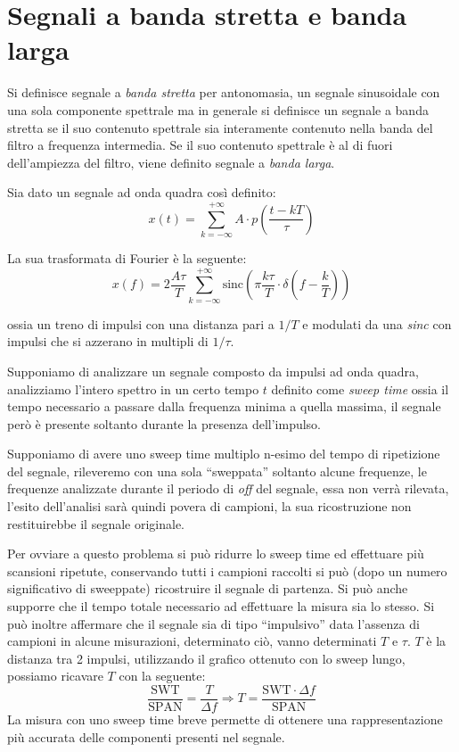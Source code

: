 
\section{Segnali a banda stretta e banda larga}
Si definisce segnale a \textit{banda stretta} per antonomasia, un segnale sinusoidale
con una sola componente spettrale ma in generale
si definisce un segnale a banda stretta se il suo contenuto spettrale
sia interamente contenuto nella banda del filtro a frequenza intermedia.
Se il suo contenuto spettrale è al di fuori dell'ampiezza del filtro,
viene definito segnale a \textit{banda larga}.

Sia dato un segnale ad onda quadra così definito:
$$
x(t) = \sum_{k = -\infty}^{+\infty} A\cdot p\left(\frac{t-kT}{\tau}\right)
$$

La sua trasformata di Fourier è la seguente:
$$
x(f) = 2 \frac{A\tau}{T} \sum_{k=-\infty}^{+\infty} \text{sinc} \left(\pi \frac{k\tau}{T}\cdot  \delta\left(f-\frac{k}{T}\right)  \right)
$$

ossia un treno di impulsi con una distanza pari a $1/T$ e modulati
da una \textit{sinc} con impulsi che si azzerano in multipli di $1/\tau$.

Supponiamo di analizzare un segnale composto da impulsi ad onda quadra,
analizziamo l'intero spettro in un certo tempo $t$ definito come \textit{sweep time}
ossia il tempo necessario a passare dalla frequenza minima a quella massima,
il segnale però è presente soltanto durante la presenza dell'impulso.

\begin{figure}[h] %
    \centering
    \def\svgwidth{0.6\columnwidth}
    
\end{figure}


Supponiamo di avere uno sweep time multiplo n-esimo
del tempo di ripetizione del segnale, rileveremo con una sola ``sweppata''
soltanto alcune frequenze, le frequenze analizzate durante il periodo di \textit{off}
del segnale, essa non verrà rilevata, l'esito dell'analisi sarà quindi povera di campioni,
la sua ricostruzione non restituirebbe il segnale originale.

Per ovviare a questo problema si può ridurre lo sweep time ed effettuare più scansioni
ripetute, conservando tutti i campioni raccolti si può (dopo un numero significativo di sweeppate)
ricostruire il segnale di partenza. Si può anche supporre che il tempo totale necessario ad effettuare
la misura sia lo stesso.
Si può inoltre affermare che il segnale sia di tipo ``impulsivo'' data l'assenza di campioni in
alcune misurazioni, determinato ciò, vanno determinati $T$ e $\tau$.
$T$ è la distanza tra 2 impulsi, utilizzando il grafico ottenuto con lo sweep lungo,
possiamo ricavare $T$ con la seguente:
$$
    \frac{\text{SWT}}{\text{SPAN}} = \frac{T}{\Delta f} \Rightarrow T = \frac{\text{SWT}\cdot\Delta f}{\text{SPAN}}
$$
La misura con uno sweep time breve permette di ottenere una rappresentazione
più accurata delle componenti presenti nel segnale.

